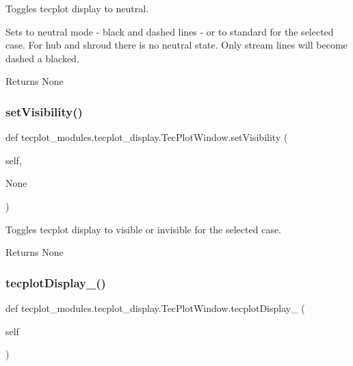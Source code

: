 Toggles tecplot display to neutral. 

Sets to neutral mode -\/ black and dashed lines -\/ or to standard for the selected case. For hub and shroud there is no neutral state. Only stream lines will become dashed a blacked.

\begin{DoxyReturn}{Returns}
None 
\end{DoxyReturn}
\hypertarget{classtecplot__modules_1_1tecplot__display_1_1_tec_plot_window_ae50e0f3c4051d791ed30a2e9de5233ea}{}\label{classtecplot__modules_1_1tecplot__display_1_1_tec_plot_window_ae50e0f3c4051d791ed30a2e9de5233ea} 
\subsubsection{\texorpdfstring{set\+Visibility()}{setVisibility()}}
{\footnotesize\ttfamily def tecplot\+\_\+modules.\+tecplot\+\_\+display.\+Tec\+Plot\+Window.\+set\+Visibility (\begin{DoxyParamCaption}\item[{}]{self,  }\item[{}]{None }\end{DoxyParamCaption})}



Toggles tecplot display to visible or invisible for the selected case. 

\begin{DoxyReturn}{Returns}
None 
\end{DoxyReturn}
\hypertarget{classtecplot__modules_1_1tecplot__display_1_1_tec_plot_window_ae792d997329b65cfed0b8a0a5feaa1a2}{}\label{classtecplot__modules_1_1tecplot__display_1_1_tec_plot_window_ae792d997329b65cfed0b8a0a5feaa1a2} 
\subsubsection{\texorpdfstring{tecplot\+Display\+\_()}{tecplotDisplay\_1()}}
{\footnotesize\ttfamily def tecplot\+\_\+modules.\+tecplot\+\_\+display.\+Tec\+Plot\+Window.\+tecplot\+Display\+\_ (\begin{DoxyParamCaption}\item[{}]{self }\end{DoxyParamCaption})}



